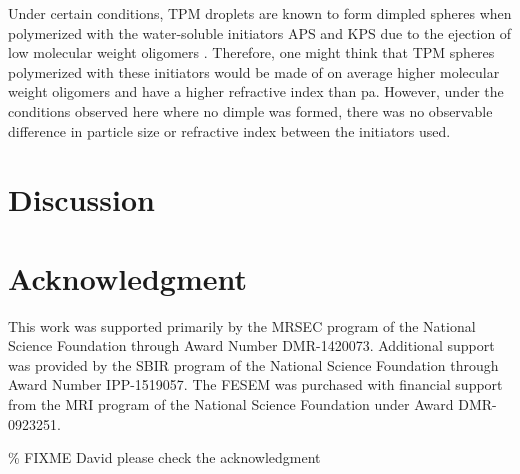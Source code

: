 Under certain conditions, TPM droplets are known to form dimpled spheres when polymerized
with the water-soluble initiators APS and KPS due to the ejection of low molecular weight
oligomers \cite{sacanna11}. %
Therefore, one might think that TPM spheres polymerized with these initiators would be
made of on average higher molecular weight oligomers and have a higher refractive index
than pa. However, under the conditions observed here where no dimple was formed, there
was no observable difference in particle size or refractive index between the initiators
used.

\section{Discussion}

\section{Acknowledgment}

This work was supported primarily by the MRSEC program of
the National Science Foundation through Award Number DMR-1420073.
Additional support was provided by the SBIR program of the
National Science Foundation through Award Number IPP-1519057.
The FESEM was purchased with financial support from the MRI program
of the National Science Foundation under Award DMR-0923251.

\% FIXME David please check the acknowledgment
